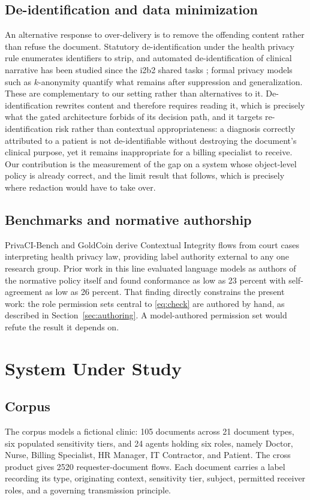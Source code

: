 \documentclass[conference]{IEEEtran}
\begin{document}
\subsection{De-identification and data minimization}
An alternative response to over-delivery is to remove the offending content
rather than refuse the document. Statutory de-identification under the health
privacy rule enumerates identifiers to strip, and automated de-identification of
clinical narrative has been studied since the i2b2 shared tasks \cite{b24};
formal privacy models such as $k$-anonymity \cite{b25} quantify what
remains after suppression and generalization. These are complementary to our
setting rather than alternatives to it. De-identification rewrites content and
therefore requires reading it, which is precisely what the gated architecture
forbids of its decision path, and it targets re-identification risk rather than
contextual appropriateness: a diagnosis correctly attributed to a patient is not
de-identifiable without destroying the document's clinical purpose, yet it
remains inappropriate for a billing specialist to receive. Our contribution is
the measurement of the gap on a system whose object-level policy is already
correct, and the limit result that follows, which is precisely where redaction
would have to take over.

\subsection{Benchmarks and normative authorship}
PrivaCI-Bench \cite{b26} and GoldCoin \cite{b27} derive Contextual Integrity
flows from court cases interpreting health privacy law, providing label
authority external to any one research group. Prior work in this line \cite{b4}
evaluated language models as authors of the normative policy itself and found
conformance as low as 23 percent with self-agreement as low as 26 percent. That
finding directly constrains the present work: the role permission sets central
to \eqref{eq:check} are authored by hand, as described in
Section~\ref{sec:authoring}. A model-authored permission set would refute the
result it depends on.

\section{System Under Study}

\subsection{Corpus}
The corpus models a fictional clinic: 105 documents across 21 document types,
six populated sensitivity tiers, and 24 agents holding six roles, namely Doctor,
Nurse, Billing Specialist, HR Manager, IT Contractor, and Patient. The cross
product gives 2520 requester-document flows. Each document carries a label
recording its type, originating context, sensitivity tier, subject, permitted
receiver roles, and a governing transmission principle.
\end{document}
